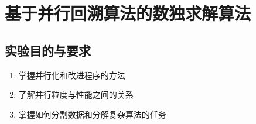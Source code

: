 \documentclass{report}
\begin{document}













\chapter{基于并行回溯算法的数独求解算法}
\section{实验目的与要求}
\begin{enumerate}
    \item 掌握并行化和改进程序的方法
    \item 了解并行粒度与性能之间的关系
    \item 掌握如何分割数据和分解复杂算法的任务
\end{enumerate}
\end{document}
